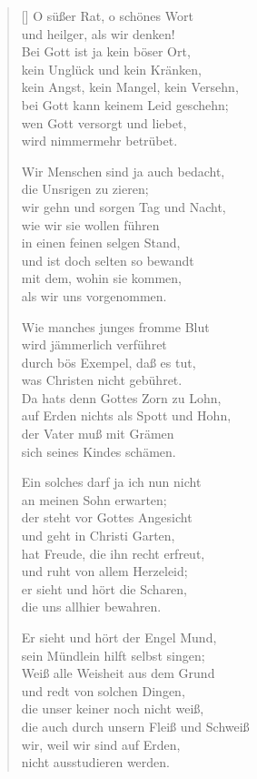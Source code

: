 \begin{multicols}{2}
\begin{verse}[\versewidth]
 O süßer Rat, o schönes Wort\\
und heilger, als wir denken!\\
Bei Gott ist ja kein böser Ort,\\
kein Unglück und kein Kränken,\\
kein Angst, kein Mangel, kein Versehn,\\
bei Gott kann keinem Leid geschehn;\\
wen Gott versorgt und liebet,\\
wird nimmermehr betrübet.

 Wir Menschen sind ja auch bedacht,\\
die Unsrigen zu zieren;\\
wir gehn und sorgen Tag und Nacht,\\
wie wir sie wollen führen\\
in einen feinen selgen Stand,\\
und ist doch selten so bewandt\\
mit dem, wohin sie kommen,\\
als wir uns vorgenommen.

 Wie manches junges fromme Blut\\
wird jämmerlich verführet\\
durch bös Exempel, daß es tut,\\
was Christen nicht gebühret.\\
Da hats denn Gottes Zorn zu Lohn,\\
auf Erden nichts als Spott und Hohn,\\
der Vater muß mit Grämen\\
sich seines Kindes schämen.

 Ein solches darf ja ich nun nicht\\
an meinen Sohn erwarten;\\
der steht vor Gottes Angesicht\\
und geht in Christi Garten,\\
hat Freude, die ihn recht erfreut,\\
und ruht von allem Herzeleid;\\
er sieht und hört die Scharen,\\
die uns allhier bewahren.

 Er sieht und hört der Engel Mund,\\
sein Mündlein hilft selbst singen;\\
Weiß alle Weisheit aus dem Grund\\
und redt von solchen Dingen,\\
die unser keiner noch nicht weiß,\\
die auch durch unsern Fleiß und Schweiß\\
wir, weil wir sind auf Erden,\\
nicht ausstudieren werden.


\end{verse}
\end{multicols}
